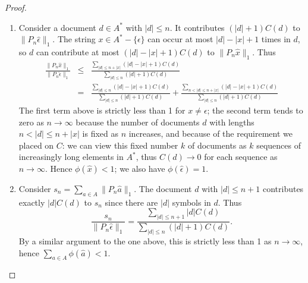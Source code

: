 \begin{proof}
\mbox{}
\begin{enumerate}
\item Consider a document $d \in A^*$ with $|d| \le n$. It contributes $(|d|+1)C(d)$ to $\|P_n\hat{\epsilon}\|_1$. The string $x \in A^* - \{\epsilon\}$ can occur at most $|d| - |x| + 1$ times in $d$, so $d$ can contribute at most $(|d|- |x| + 1)C(d)$ to $\|P_n\hat{x}\|_1$. Thus
\begin{eqnarray*}
\frac{\|P_n\hat{x}\|_1}{\|P_n\hat{\epsilon}\|_1} &\le& \frac{\sum_{|d| \le n + |x|}(|d| - |x| + 1)C(d)}{\sum_{|d| \le n}(|d|+1)C(d)}\\
&=& \frac{\sum_{|d| \le n}(|d| - |x| + 1)C(d)}{\sum_{|d| \le n}(|d|+1)C(d)} +  \frac{\sum_{n < |d| \le n + |x|}(|d| - |x| + 1)C(d)}{\sum_{|d| \le n}(|d|+1)C(d)}
\end{eqnarray*}
The first term above is strictly less than 1 for $x \neq \epsilon$; the second term tends to zero as $n\rightarrow\infty$ because the number of documents $d$ with lengths $n < |d| \le n+|x|$ is fixed as $n$ increases, and because of the requirement we placed on $C$: we can view this fixed number $k$ of documents as $k$ sequences of increasingly long elements in $A^*$, thus $C(d) \rightarrow 0$ for each sequence as $n\rightarrow \infty$. Hence $\phi(\hat{x}) < 1$; we also have $\phi(\hat{\epsilon}) = 1$.

\item Consider $s_n = \sum_{a \in A} \|P_n\hat{a}\|_1.$ The document $d$ with $|d| \le n + 1$ contributes exactly $|d|C(d)$ to $s_n$ since there are $|d|$ symbols in $d$. Thus
$$\frac{s_n}{\|P_n\hat{\epsilon}\|_1} = \frac{\sum_{|d| \le n + 1} |d|C(d)}{\sum_{|d| \le n}(|d|+1)C(d)}.$$
By a similar argument to the one above, this is strictly less than 1 as $n\rightarrow\infty$, hence $\sum_{a \in A} \phi(\hat{a}) < 1$.


\end{enumerate}
\end{proof}
